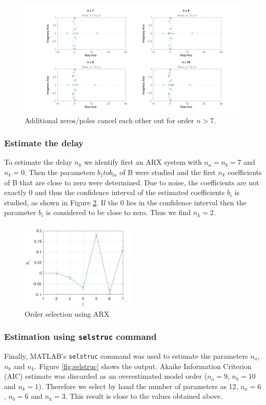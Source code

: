 \documentclass[a4paper,11pt]{article}
\begin{document}
\begin{figure}[H]
\centering
\includegraphics[width=\textwidth]{images/zeropolecancel}
\caption{Additional zeros/poles cancel each other out for order $n>7$.}
\label{fig:zeropolecancel}
\end{figure}


\subsubsection{Estimate the delay}
To estimate the delay $n_k$ we identify first an ARX system with $n_a = n_b = 7$ and $n_k = 0$.
Then the parameters $b_1 to b_m$ of B were studied and the first $n_k$ coefficients of B that are close to zero were determined.
Due to noise, the coefficients are not exactly 0 and thus the confidence interval of the estimated coefficients $b_i$ is studied, as shown in Figure \ref{fig:nksel}. If the 0 lies in the confidence interval then the parameter $b_i$ is considered to be close to zero.
Thus we find $n_k = 2$.

\begin{figure}[H]
\centering
\includegraphics[width=0.5\textwidth]{images/nksel}
\caption{Order selection using ARX}
\label{fig:nksel}
\end{figure}

\subsubsection{Estimation using \texttt{selstruc} command}
Finally, MATLAB's \verb'selstruc' command was used to estimate the parameters $n_a$, $n_b$ and $n_k$. Figure \ref{fig:selstruc} shows the output. Akaike Information Criterion (AIC) estimate was discarded as an overestimated model order ($n_a=9$, $n_b=10$ and $n_k=1$). Therefore we select by hand the number of parameters as 12, $n_a=6$, $n_b=6$ and $n_k=3$. This result is close to the values obtained above.
\end{document}
